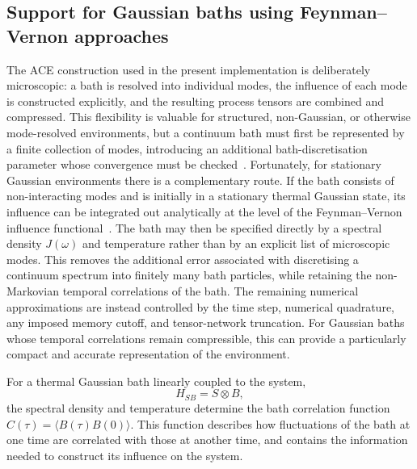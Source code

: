 \subsection{Support for Gaussian baths using Feynman--Vernon approaches}
\label{subsec:roadmap-pttempo}

The ACE construction used in the present implementation is deliberately microscopic: a bath is resolved into individual modes, the influence of each mode is constructed explicitly, and the resulting process tensors are combined and compressed.
This flexibility is valuable for structured, non-Gaussian, or otherwise mode-resolved environments, but a continuum bath must first be represented by a finite collection of modes, introducing an additional bath-discretisation parameter whose convergence must be checked~\cite{cygorek2022ace}.
Fortunately, for stationary Gaussian environments there is a complementary route.
If the bath consists of non-interacting modes and is initially in a stationary thermal Gaussian state, its influence can be integrated out analytically at the level of the Feynman--Vernon influence functional~\cite{feynman1963influence,makri1995tensor}.
The bath may then be specified directly by a spectral density $J(\omega)$ and temperature rather than by an explicit list of microscopic modes.
This removes the additional error associated with discretising a continuum spectrum into finitely many bath particles, while retaining the non-Markovian temporal correlations of the bath.
The remaining numerical approximations are instead controlled by the time step, numerical quadrature, any imposed memory cutoff, and tensor-network truncation.
For Gaussian baths whose temporal correlations remain compressible, this can provide a particularly compact and accurate representation of the environment.

For a thermal Gaussian bath linearly coupled to the system,
%
\begin{equation}
    H_{SB}=S\otimes B,
\end{equation}
%
the spectral density and temperature determine the bath correlation
function \(C(\tau)=\langle B(\tau)B(0)\rangle\).
This function describes how fluctuations of the bath at one time are
correlated with those at another time, and contains the information
needed to construct its influence on the system.

